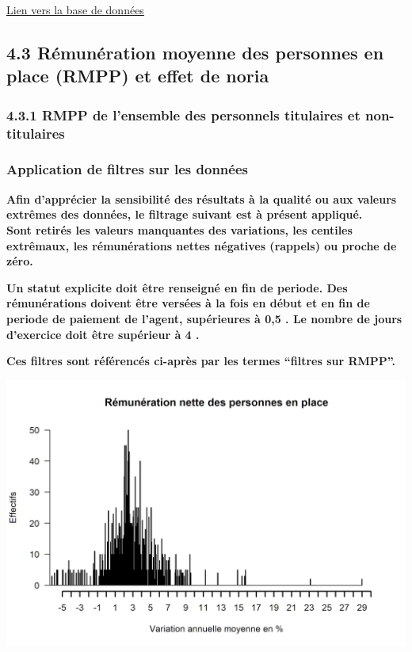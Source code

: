 \href{../Bases/Remunerations/Analyse.variations.par.exercice.csv}{Lien vers
la base de données}

\hypertarget{remuneration-moyenne-des-personnes-en-place-rmpp-et-effet-de-noria}{%
\subsection{4.3 Rémunération moyenne des personnes en place (RMPP) et
effet de
noria}\label{remuneration-moyenne-des-personnes-en-place-rmpp-et-effet-de-noria}}

\hypertarget{rmpp-de-lensemble-des-personnels-titulaires-et-non-titulaires}{%
\subsubsection{4.3.1 RMPP de l'ensemble des personnels titulaires et
non-titulaires}\label{rmpp-de-lensemble-des-personnels-titulaires-et-non-titulaires}}

\hypertarget{application-de-filtres-sur-les-donnees}{%
\subsubsection{Application de filtres sur les
données}\label{application-de-filtres-sur-les-donnees}}

\textbf{Afin d'apprécier la sensibilité des résultats à la qualité ou
aux valeurs extrêmes des données, le filtrage suivant est à présent
appliqué.}\\
\textbf{Sont retirés les valeurs manquantes des variations, les centiles
extrêmaux, les rémunérations nettes négatives (rappels) ou proche de
zéro.}

\textbf{Un statut explicite doit être renseigné en fin de periode. Des
rémunérations doivent être versées à la fois en début et en fin de
periode de paiement de l'agent, supérieures à 0,5 . Le nombre de jours
d'exercice doit être supérieur à 4 .}

\textbf{Ces filtres sont référencés ci-après par les termes ``filtres
sur RMPP''.}

\includegraphics{altair_files/figure-latex/unnamed-chunk-133-1.png}


